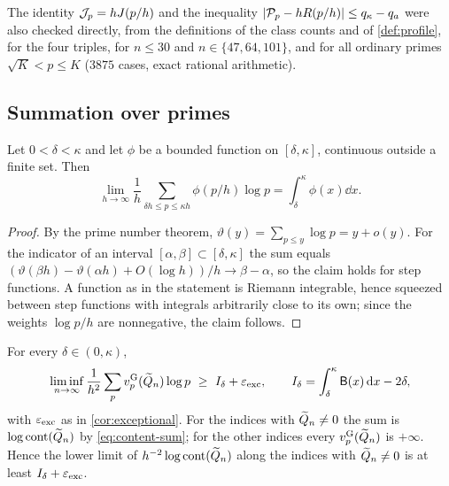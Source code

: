 The identity $\mathcal{J}_p=hJ(p/h)$ and the inequality $|\mathcal{P}_p-hR(p/h)|\le q_\kappa-q_a$ were also checked directly, from the definitions of the class counts and of \cref{def:profile}, for the four triples, for $n\le30$ and $n\in\{47,64,101\}$, and for all ordinary primes $\sqrt K<p\le K$ ($3875$ cases, exact rational arithmetic).

\subsection{Summation over primes}\label{sec:pnt}

\begin{lemma}\label{lem:pnt}
Let $0<\delta<\kappa$ and let $\phi$ be a bounded function on $[\delta,\kappa]$, continuous outside a finite set. Then
\[
\lim_{h\to\infty}\frac1h\sum_{\delta h\le p\le\kappa h}\phi(p/h)\log p=\int_\delta^\kappa\phi(x)\dd x .
\]
\end{lemma}

\begin{proof}
By the prime number theorem, $\vartheta(y)=\sum_{p\le y}\log p=y+o(y)$. For the indicator of an interval $[\alpha,\beta]\subset[\delta,\kappa]$ the sum equals $(\vartheta(\beta h)-\vartheta(\alpha h)+O(\log h))/h\to\beta-\alpha$, so the claim holds for step functions. A function as in the statement is Riemann integrable, hence squeezed between step functions with integrals arbitrarily close to its own; since the weights $\log p/h$ are nonnegative, the claim follows.
\end{proof}

\begin{theorem}\label{thm:arith-general}
For every $\delta\in(0,\kappa)$,
\[
\liminf_{n\to\infty}\frac1{h^2}\sum_pv^{\mathrm{G}}_{p}(\widetilde{Q}_n)\log p\ \ge\ I_\delta+\varepsilon_{\mathrm{exc}},\qquad I_\delta=\int_\delta^\kappa\mathsf B(x)\,\mathrm{d} x-2\delta,
\]
with $\varepsilon_{\mathrm{exc}}$ as in \cref{cor:exceptional}. For the indices with $\widetilde{Q}_n\ne0$ the sum is $\log\operatorname{cont}(\widetilde{Q}_n)$ by \eqref{eq:content-sum}; for the other indices every $v^{\mathrm{G}}_{p}(\widetilde{Q}_n)$ is $+\infty$. Hence the lower limit of $h^{-2}\log\operatorname{cont}(\widetilde{Q}_n)$ along the indices with $\widetilde{Q}_n\ne0$ is at least $I_\delta+\varepsilon_{\mathrm{exc}}$.
\end{theorem}

